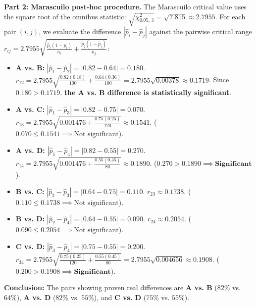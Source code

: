\begin{solucion}
	\textbf{Part 2: Marascuilo post-hoc procedure.}
	The Marascuilo critical value uses the square root of the omnibus statistic: $\sqrt{\chi^2_{0.05, \, 3}} = \sqrt{7.815} \approx 2.7955$.
	For each pair $(i, j)$, we evaluate the difference $|\hat{p}_i - \hat{p}_j|$ against the pairwise critical range $r_{ij} = 2.7955 \sqrt{\frac{\hat{p}_i(1-\hat{p}_i)}{n_i} + \frac{\hat{p}_j(1-\hat{p}_j)}{n_j}}$:
	\begin{itemize}
		\item \textbf{A vs. B:} $|\hat{p}_1 - \hat{p}_2| = |0.82 - 0.64| = 0.180$.
		$r_{12} = 2.7955 \sqrt{\frac{0.82(0.18)}{100} + \frac{0.64(0.36)}{100}} = 2.7955 \sqrt{0.00378} \approx 0.1719$.
		Since $0.180 > 0.1719$, \textbf{the A vs. B difference is statistically significant}.
		\item \textbf{A vs. C:} $|\hat{p}_1 - \hat{p}_3| = |0.82 - 0.75| = 0.070$.
		$r_{13} = 2.7955 \sqrt{0.001476 + \frac{0.75(0.25)}{120}} \approx 0.1541$. ($0.070 \le 0.1541 \implies \text{Not significant}$).
		\item \textbf{A vs. D:} $|\hat{p}_1 - \hat{p}_4| = |0.82 - 0.55| = 0.270$.
		$r_{14} = 2.7955 \sqrt{0.001476 + \frac{0.55(0.45)}{80}} \approx 0.1890$. ($0.270 > 0.1890 \implies \textbf{Significant}$).
		\item \textbf{B vs. C:} $|\hat{p}_2 - \hat{p}_3| = |0.64 - 0.75| = 0.110$.
		$r_{23} \approx 0.1738$. ($0.110 \le 0.1738 \implies \text{Not significant}$).
		\item \textbf{B vs. D:} $|\hat{p}_2 - \hat{p}_4| = |0.64 - 0.55| = 0.090$.
		$r_{24} \approx 0.2054$. ($0.090 \le 0.2054 \implies \text{Not significant}$).
		\item \textbf{C vs. D:} $|\hat{p}_3 - \hat{p}_4| = |0.75 - 0.55| = 0.200$.
		$r_{34} = 2.7955 \sqrt{\frac{0.75(0.25)}{120} + \frac{0.55(0.45)}{80}} = 2.7955 \sqrt{0.004656} \approx 0.1908$. ($0.200 > 0.1908 \implies \textbf{Significant}$).
	\end{itemize}
	\textbf{Conclusion:} The pairs showing proven real differences are \textbf{A vs. B} ($82\%$ vs. $64\%$), \textbf{A vs. D} ($82\%$ vs. $55\%$), and \textbf{C vs. D} ($75\%$ vs. $55\%$).
\end{solucion}

